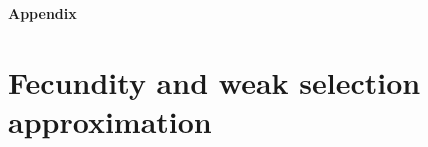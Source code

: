 \documentclass[11pt, letterpaper]{article}
\newcommand{\appname}[0]{Appendix}
\begin{document}
\clearpage

\appendix
 
\renewcommand{\theequation}{\thesection.\arabic{equation}}
\setcounter{equation}{0}  %
 
\renewcommand{\thefigure}{S\arabic{figure}}
\setcounter{figure}{0}

\renewcommand{\thetable}{S\arabic{table}}
\setcounter{table}{0} 
\begin{center}
{\LARGE \bfseries\sffamily  \appname}
\end{center}

\section{Fecundity and weak selection approximation\label{sec:app:F}}
\end{document}

